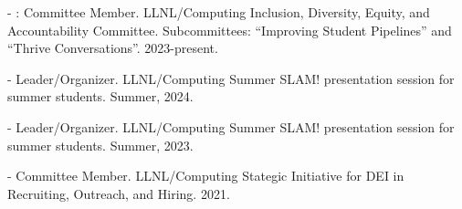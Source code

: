\begin{innerlist}
  \item[-]: Committee Member.
  LLNL/Computing Inclusion, Diversity, Equity, and Accountability Committee.
  Subcommittees: ``Improving Student Pipelines'' and ``Thrive Conversations''.  
  2023-present.

  \item[-] Leader/Organizer.
  LLNL/Computing Summer SLAM! presentation session for summer students.
  Summer, 2024.

  \item[-] Leader/Organizer.
  LLNL/Computing Summer SLAM! presentation session for summer students.
  Summer, 2023.

  \item[-] Committee Member.
  LLNL/Computing Stategic Initiative for DEI in Recruiting, Outreach, and Hiring.
  2021.

\end{innerlist}

